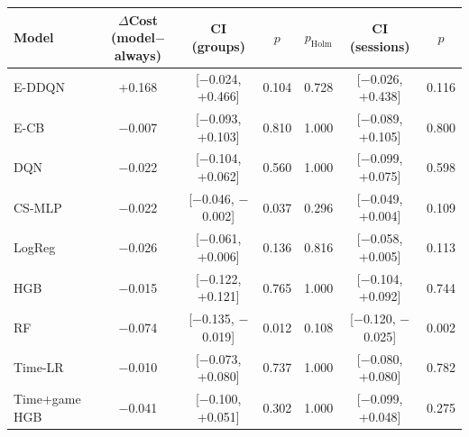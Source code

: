 \begin{tabular}{lcccccc}
\toprule
Model & $\Delta$Cost (model$-$always) & CI (groups) & $p$ & $p_{\text{Holm}}$ & CI (sessions) & $p$ \\
\midrule
E-DDQN & +0.168 & [$-$0.024, +0.466] & 0.104 & 0.728 & [$-$0.026, +0.438] & 0.116 \\
E-CB & $-$0.007 & [$-$0.093, +0.103] & 0.810 & 1.000 & [$-$0.089, +0.105] & 0.800 \\
DQN & $-$0.022 & [$-$0.104, +0.062] & 0.560 & 1.000 & [$-$0.099, +0.075] & 0.598 \\
CS-MLP & $-$0.022 & [$-$0.046, $-$0.002] & 0.037 & 0.296 & [$-$0.049, +0.004] & 0.109 \\
LogReg & $-$0.026 & [$-$0.061, +0.006] & 0.136 & 0.816 & [$-$0.058, +0.005] & 0.113 \\
HGB & $-$0.015 & [$-$0.122, +0.121] & 0.765 & 1.000 & [$-$0.104, +0.092] & 0.744 \\
RF & $-$0.074 & [$-$0.135, $-$0.019] & 0.012 & 0.108 & [$-$0.120, $-$0.025] & 0.002 \\
Time-LR & $-$0.010 & [$-$0.073, +0.080] & 0.737 & 1.000 & [$-$0.080, +0.080] & 0.782 \\
Time+game HGB & $-$0.041 & [$-$0.100, +0.051] & 0.302 & 1.000 & [$-$0.099, +0.048] & 0.275 \\
\bottomrule
\end{tabular}

